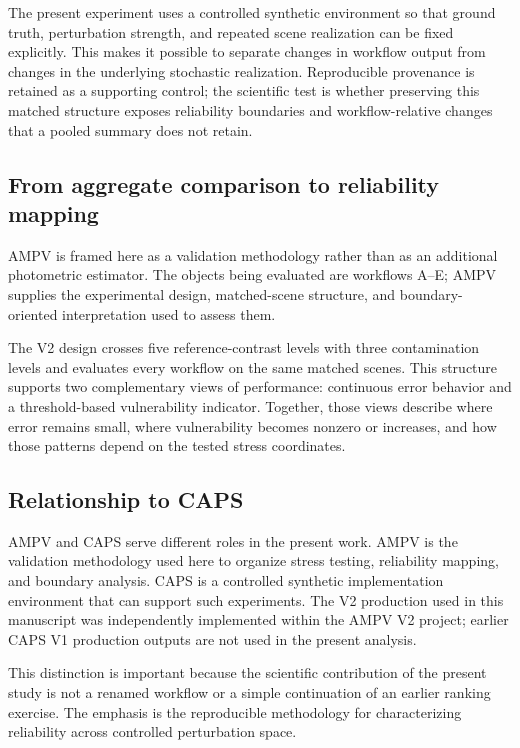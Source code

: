 The present experiment uses a controlled synthetic environment so that
ground truth, perturbation strength, and repeated scene realization can
be fixed explicitly. \cite{ref5} This makes it possible to separate
changes in workflow output from changes in the underlying stochastic
realization. Reproducible provenance is retained as a supporting control;
the scientific test is whether preserving this matched structure exposes
reliability boundaries and workflow-relative changes that a pooled
summary does not retain.

\subsection{From aggregate comparison to reliability
mapping}\label{from-aggregate-comparison-to-reliability-mapping}

AMPV is framed here as a validation methodology rather than as an
additional photometric estimator. The objects being evaluated are
workflows A--E; AMPV supplies the experimental design, matched-scene
structure, and boundary-oriented interpretation used
to assess them.

The V2 design crosses five reference-contrast levels with three
contamination levels and evaluates every workflow on the same matched
scenes. This structure supports two complementary views of performance:
continuous error behavior and a threshold-based vulnerability indicator.
Together, those views describe where error remains small, where
vulnerability becomes nonzero or increases, and how those patterns
depend on the tested stress coordinates.

\subsection{Relationship to CAPS}\label{relationship-to-caps}

AMPV and CAPS serve different roles in the present work. AMPV is the
validation methodology used here to organize stress testing,
reliability mapping, and boundary analysis. CAPS is a controlled
synthetic implementation environment that can support such experiments.
The V2 production used in this manuscript was independently implemented
within the AMPV V2 project; earlier CAPS V1 production outputs are not
used in the present analysis.

This distinction is important because the scientific contribution of the
present study is not a renamed workflow or a simple continuation of an
earlier ranking exercise. The emphasis is the reproducible methodology
for characterizing reliability across controlled perturbation space.

